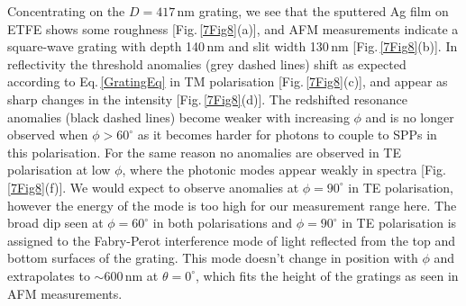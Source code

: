 Concentrating on the $D=417$\,nm grating, we see that the sputtered Ag film on ETFE shows some roughness [Fig.\,\ref{7Fig8}(a)], and AFM measurements indicate a square-wave grating with depth 140\,nm and slit width 130\,nm [Fig.\,\ref{7Fig8}(b)]. In reflectivity the threshold anomalies (grey dashed lines) shift as expected according to Eq.\,\ref{GratingEq} in TM polarisation [Fig.\,\ref{7Fig8}(c)], and appear as sharp changes in the intensity [Fig.\,\ref{7Fig8}(d)]. The redshifted resonance anomalies (black dashed lines) become weaker with increasing $\phi$ and is no longer observed when $\phi>60^{\circ}$ as it becomes harder for photons to couple to SPPs in this polarisation. For the same reason no anomalies are observed in TE polarisation at low $\phi$, where the photonic modes appear weakly in spectra [Fig.\,\ref{7Fig8}(f)]. We would expect to observe anomalies at $\phi=90^{\circ}$ in TE polarisation, however the energy of the mode is too high for our measurement range here. The broad dip seen at $\phi=60^{\circ}$ in both polarisations and $\phi=90^{\circ}$ in TE polarisation is assigned to the Fabry-Perot interference mode of light reflected from the top and bottom surfaces of the grating. This mode doesn't change in position with $\phi$ and extrapolates to $\sim600$\,nm at $\theta=0^{\circ}$, which fits the height of the gratings as seen in AFM measurements.
